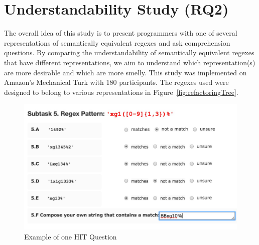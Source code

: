 \section{Understandability Study (RQ2)}
\label{sec:understandability}
The overall idea of this study  is to present  programmers with one of several representations of semantically equivalent regexes and ask comprehension questions. By comparing the understandability of semantically equivalent regexes that have different representations, we aim to understand which representation(s)  are more desirable and which are more smelly. 
This study was  implemented on Amazon's Mechanical Turk with 180 participants. The regexes used were designed to belong to various representations in Figure~\ref{fig:refactoringTree}. 



\begin{figure}[tb]
\centering
\includegraphics[width=\columnwidth]{illustrations/exampleQuestion}
\vspace{-12pt}
\caption{Example of one HIT Question}
\vspace{-6pt}
\label{fig:exampleQuestion}
\end{figure}



